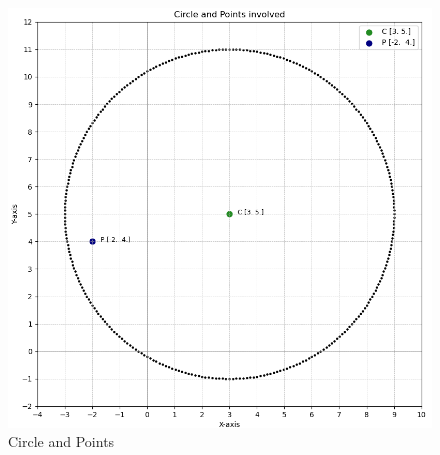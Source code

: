 \documentclass[journal]{IEEEtran}
\begin{document}
\begin{figure}[h!]
    \centering
    \includegraphics[width=0.7\columnwidth]{figs/Figure_1.png}
    \caption{Circle and Points}
    \label{7-7.2-28-fig-0}
\end{figure}
\end{document}
